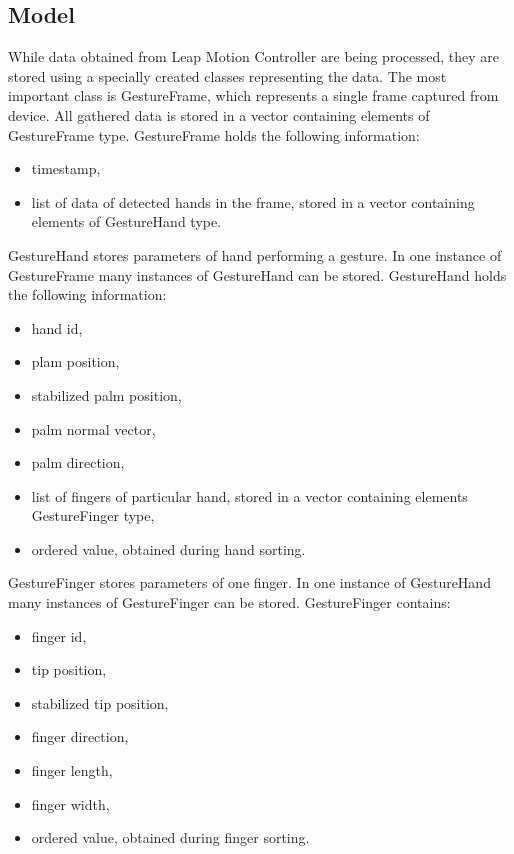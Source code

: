 \subsection{Model}\label{modelSubsection}

While data obtained from Leap Motion Controller are being processed, they are stored using a specially created classes representing the data. The most important class is GestureFrame, which represents a single frame captured from device. All gathered data is stored in a vector containing elements of GestureFrame type. GestureFrame holds the following information:

\begin{itemize}
\item timestamp,
\item list of data of detected hands in the frame, stored in a vector containing elements of GestureHand type.
\end{itemize}

GestureHand stores parameters of hand performing a gesture. In one instance of GestureFrame many instances of GestureHand can be stored. GestureHand holds the following information:
\begin{itemize}
\item hand id,
\item plam position,
\item stabilized palm position,
\item palm normal vector,
\item palm direction,
\item list of fingers of particular hand, stored in a vector containing elements GestureFinger type,
\item ordered value, obtained during hand sorting.
\end{itemize}

GestureFinger stores parameters of one finger. In one instance of GestureHand many instances of GestureFinger can be stored. GestureFinger contains:
\begin{itemize}
\item finger id,
\item tip position,
\item stabilized tip position,
\item finger direction,
\item finger length,
\item finger width,
\item ordered value, obtained during finger sorting.
\end{itemize}

